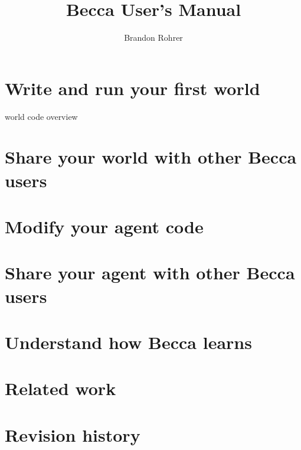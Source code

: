 \documentclass[12pt,oneside]{book}
\begin{document}
\title{Becca User's Manual}
\author{Brandon Rohrer}

\maketitle
\tableofcontents
\newpage

\addtolength{\parskip}{\baselineskip}

\setcounter{tocdepth}{0}



\chapter{Write and run your first world}
world code overview

\chapter{Share your world with other Becca users}

\chapter{Modify your agent code}

\chapter{Share your agent with other Becca users}

\chapter{Understand how Becca learns}

\appendix
\chapter{Related work}

\chapter{Revision history}



\end{document}
